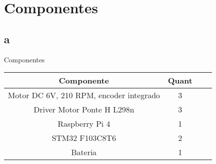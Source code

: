 

\chapter{Componentes}

\section{a}



\begin{quadro}[htb]
\caption{\label{lista de componentes}Componentes}
 \begin{tabular}{|c|c|c|c|}
	\hline
	\textbf{Componente} & \textbf{Quant} \\ \hline
	Motor DC 6V,  210 RPM, encoder integrado & 3  \\ \hline
	Driver Motor Ponte H L298n  & 3  \\ \hline
	Raspberry Pi 4    & 1   \\ \hline
	STM32 F103C8T6 & 2     \\ \hline
	Bateria & 1     \\ \hline
\end{tabular}
\end{quadro}


